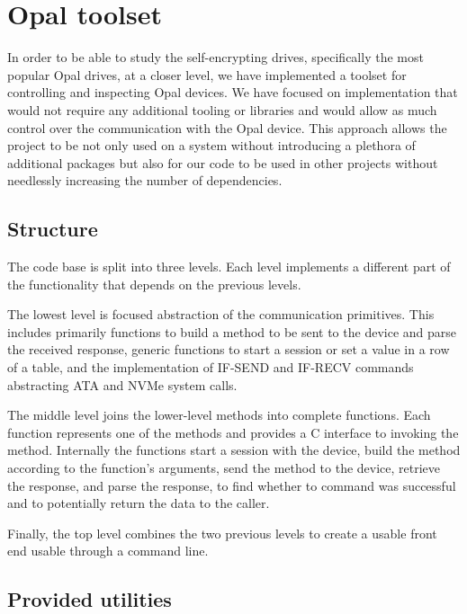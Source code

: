 \chapter{Opal toolset}


In order to be able to study the self-encrypting drives, specifically the most popular Opal drives, at a closer level, we have implemented a toolset for controlling and inspecting Opal devices. 
We have focused on implementation that would not require any additional tooling or libraries and would allow as much control over the communication with the Opal device. This approach allows the project to be not only used on a system without introducing a plethora of additional packages but also for our code to be used in other projects without needlessly increasing the number of dependencies.

\section{Structure}

The code base is split into three levels. Each level implements a different part of the functionality that depends on the previous levels.

The lowest level is focused abstraction of the communication primitives. This includes primarily functions to build a method to be sent to the device and parse the received response, generic functions to start a session or set a value in a row of a table, and the implementation of IF-SEND and IF-RECV commands abstracting ATA and NVMe system calls.


The middle level joins the lower-level methods into complete functions. Each function represents one of the methods and provides a C interface to invoking the method. Internally the functions start a session with the device, build the method according to the function's arguments, send the method to the device, retrieve the response, and parse the response, to find whether to command was successful and to potentially return the data to the caller.

Finally, the top level combines the two previous levels to create a usable front end usable through a command line.

\section{Provided utilities}

